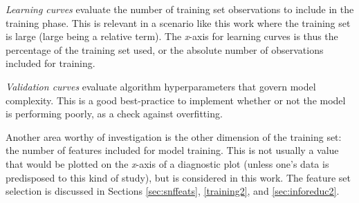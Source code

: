 \textit{Learning curves} evaluate the number of training set observations to
include in the training phase. This is relevant in a scenario like this work
where the training set is large (large being a relative term).  The
\textit{x}-axis for learning curves is thus the percentage of the training set
used, or the absolute number of observations included for training. 

\textit{Validation curves} evaluate algorithm hyperparameters that govern model
complexity. This is a good best-practice to implement whether or not the model 
is performing poorly, as a check against overfitting. 

Another area worthy of investigation is the other dimension of the training
set: the number of features included for model training. This is not usually a
value that would be plotted on the \textit{x}-axis of a diagnostic plot (unless
one's data is predisposed to this kind of study), but is considered in this
work. The feature set selection is discussed in Sections \ref{sec:snffeats},
\ref{training2}, and \ref{sec:inforeduc2}.


